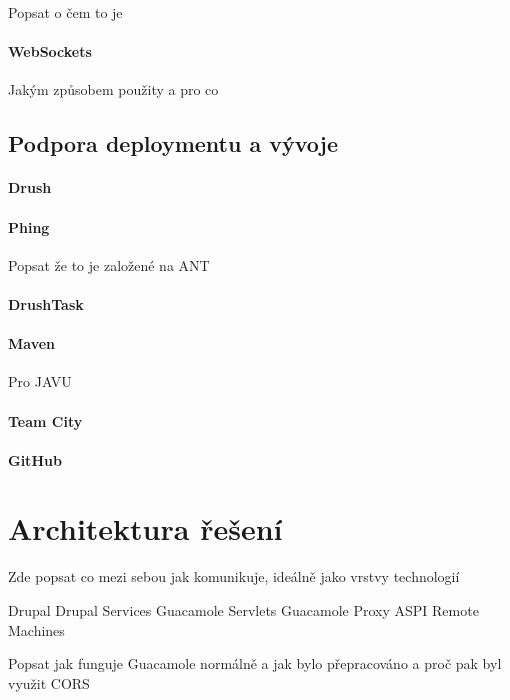 Popsat o čem to je

\paragraph*{WebSockets}

Jakým způsobem použity a pro co

\subsection{Podpora deploymentu a vývoje}

\paragraph*{Drush}

\paragraph*{Phing}

Popsat že to je založené na ANT

\paragraph*{DrushTask}

\paragraph*{Maven}

Pro JAVU

\paragraph*{Team City}

\paragraph*{GitHub}

\section{Architektura řešení}
Zde popsat co mezi sebou jak komunikuje, ideálně jako vrstvy technologií

Drupal
Drupal Services
Guacamole Servlets
Guacamole Proxy
ASPI Remote Machines

Popsat jak funguje Guacamole normálně a jak bylo přepracováno a proč pak byl využit CORS

